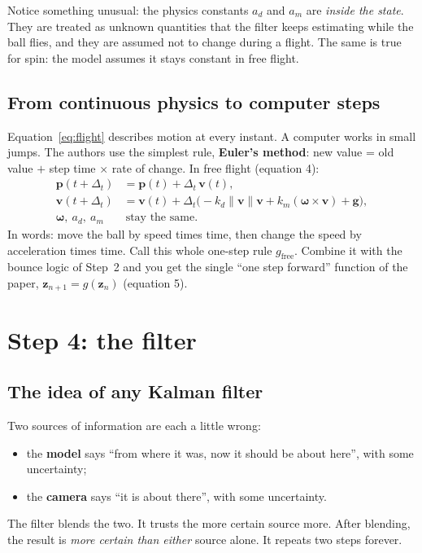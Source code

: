 \documentclass[11pt,a4paper]{article}
\newcommand{\vv}{\mathbf{v}}
\newcommand{\pp}{\mathbf{p}}
\newcommand{\ww}{\boldsymbol{\omega}}
\begin{document}
Notice something unusual: the physics constants $a_d$ and $a_m$ are \emph{inside the state}.
They are treated as unknown quantities that the filter keeps estimating while the ball flies,
and they are assumed not to change during a flight. The same is true for spin: the model
assumes it stays constant in free flight.

\subsection*{From continuous physics to computer steps}
Equation~\eqref{eq:flight} describes motion at every instant. A computer works in small
jumps. The authors use the simplest rule, \textbf{Euler's method}: new value = old value $+$ step
time $\times$ rate of change. In free flight (equation 4):
\begin{equation}
\begin{aligned}
\pp(t+\Delta_t) &= \pp(t) + \Delta_t\,\vv(t),\\
\vv(t+\Delta_t) &= \vv(t) + \Delta_t\big(-k_d\|\vv\|\vv + k_m(\ww\times\vv)+\mathbf g\big),\\
\ww,\ a_d,\ a_m &\ \text{stay the same.}
\end{aligned}
\tag{P4}
\end{equation}
\noindent In words: move the ball by speed times time, then change the speed by acceleration times
time. Call this whole one-step rule $g_{\text{free}}$. Combine it with the bounce logic of Step~2 and you get
the single ``one step forward'' function of the paper,
$\mathbf z_{n+1}=g(\mathbf z_n)$ (equation 5).

\section{Step 4: the filter}

\subsection{The idea of any Kalman filter}
Two sources of information are each a little wrong:
\begin{itemize}
\item the \textbf{model} says ``from where it was, now it should be about here'', with some
uncertainty;
\item the \textbf{camera} says ``it is about there'', with some uncertainty.
\end{itemize}
The filter blends the two. It trusts the more certain source more. After blending, the result is
\emph{more certain than either} source alone. It repeats two steps forever.
\end{document}
